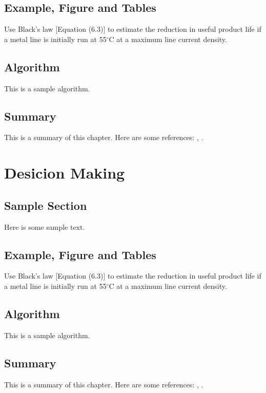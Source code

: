 \documentclass{wileySix}
\begin{document}
\section{Example, Figure and Tables}
\vskip6pt
\begin{example}
	Use Black's law [Equation (6.3)] to estimate the reduction in useful product
	life if a metal line is initially run at 55$^\circ$C at a maximum line
	current density.
\end{example}

\section{Algorithm}
This is a sample algorithm.

\section{Summary}
This is a summary of this chapter.
Here are some references: \cite{xkilby}, \cite{xberen}.

\chapter{Desicion Making}

\section{Sample Section}
Here is some sample text.

\section{Example, Figure and Tables}
\vskip6pt
\begin{example}
	Use Black's law [Equation (6.3)] to estimate the reduction in useful product
	life if a metal line is initially run at 55$^\circ$C at a maximum line
	current density.
\end{example}

\section{Algorithm}
This is a sample algorithm.

\section{Summary}
This is a summary of this chapter.
Here are some references: \cite{xkilby}, \cite{xberen}.
\end{document}
